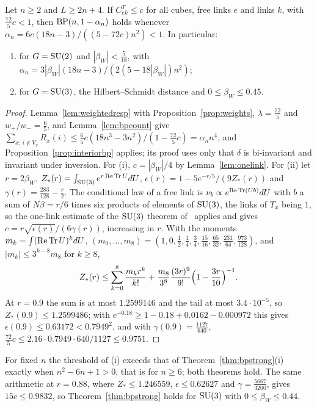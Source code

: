 \begin{theorem}\label{thm:bpweighted}
Let $n\ge2$ and $L\ge2n+4$. If $C^T_{ek}\le c$ for all cubes, free links $e$
and links $k$, with $\frac{72}5c<1$, then $\mathrm{BP}(n,1-\alpha_n)$ holds whenever
$\alpha_n=6c(18n-3)/((5-72c)n^2)<1$. In particular:
\begin{enumerate}[label=\textup{(\roman*)},leftmargin=*]
\item for $G=\mathrm{SU}(2)$ and $|\beta_W|<\frac5{18}$, with
$\alpha_n=3|\beta_W|(18n-3)/(2(5-18|\beta_W|)n^2)$;
\item for $G=\mathrm{SU}(3)$, the Hilbert--Schmidt distance and $0\le\beta_W\le0.45$.
\end{enumerate}
\end{theorem}

\begin{proof}
Lemma~\ref{lem:weightedresp} with Proposition~\ref{prop:weights},
$\lambda=\frac{72}5$ and $w_+/w_-=\frac65$, and Lemma~\ref{lem:bpcount} give
$\sum_{x:\,i\notin V_x}R_x(i)\le\frac65c(18n^3-3n^2)/(1-\frac{72}5c)=
\alpha_nn^4$, and Proposition~\ref{prop:interiorbp} applies; its proof uses
only that $\delta$ is bi-invariant and invariant under inversion. For (i),
$c=|\beta_W|/4$ by Lemma~\ref{lem:onelink}. For (ii) let $r=2\beta_W$,
$Z_*(r)=\int_{\mathrm{SU}(3)}e^{r\operatorname{Re}\operatorname{Tr} U}dU$, $\epsilon(r)=1-5e^{-r/5}/(9Z_*(r))$ and
$\gamma(r)=\frac{283}{128}-\frac r2$. The conditional law of a free link is
$\nu_b\propto e^{\operatorname{Re}\operatorname{Tr}(Ub)}dU$ with $b$ a sum of $N\beta=r/6$ times six
products of elements of $\mathrm{SU}(3)$, the links of $T_x$ being $1$, so the
one-link estimate of the $\mathrm{SU}(3)$ theorem of~\cite{BBLRS26} applies and gives
$c=r\sqrt{\epsilon(r)}/(6\gamma(r))$, increasing in $r$. With the moments
$m_k=\int(\operatorname{Re}\operatorname{Tr} U)^kdU$, $(m_0,\dots,m_8)=(1,0,\frac12,\frac14,\frac34,
\frac{15}{16},\frac{65}{32},\frac{231}{64},\frac{973}{128})$, and $|m_k|\le
3^{k-8}m_8$ for $k\ge8$,
\[
Z_*(r)\le\sum_{k=0}^8\frac{m_kr^k}{k!}+\frac{m_8}{3^8}\frac{(3r)^9}{9!}
\Bigl(1-\frac{3r}{10}\Bigr)^{-1}.
\]
At $r=0.9$ the sum is at most $1.2599146$ and the tail at most
$3.4\cdot10^{-5}$, so $Z_*(0.9)\le1.2599486$; with $e^{-0.18}\ge1-0.18+0.0162
-0.000972$ this gives $\epsilon(0.9)\le0.63172<0.7949^2$, and with
$\gamma(0.9)=\frac{1127}{640}$, $\frac{72}5c\le2.16\cdot0.7949\cdot640/1127
\le0.9751$.
\end{proof}

For fixed $n$ the threshold of (i) exceeds that of
Theorem~\ref{thm:bpstrong}(i) exactly when $n^2-6n+1>0$, that is for $n\ge6$;
both theorems hold. The same arithmetic at $r=0.88$, where $Z_*\le1.246559$,
$\epsilon\le0.62627$ and $\gamma=\frac{5667}{3200}$, gives $15c\le0.9832$, so
Theorem~\ref{thm:bpstrong} holds for $\mathrm{SU}(3)$ with $0\le\beta_W\le0.44$.

